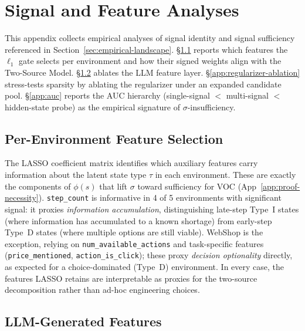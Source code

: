 \section{Signal and Feature Analyses}
\label{app:signal-analyses}

This appendix collects empirical analyses of signal identity
and signal sufficiency referenced in
Section~\ref{sec:empirical-landscape}.
\S\ref{app:feature-selection} reports which features the
$\ell_1$ gate selects per environment and how their signed weights
align with the Two-Source Model.
\S\ref{app:llm-features} ablates the LLM feature layer.
\S\ref{app:regularizer-ablation} stress-tests sparsity by
ablating the regularizer under an expanded candidate pool.
\S\ref{app:auc} reports the AUC hierarchy
(single-signal $<$ multi-signal $<$ hidden-state probe) as the
empirical signature of $\sigma$-insufficiency.

\subsection{Per-Environment Feature Selection}
\label{app:feature-selection}

The LASSO coefficient matrix identifies which auxiliary features
carry information about the latent state type $\tau$ in each
environment. These are exactly the components of $\phi(s)$ that
lift $\sigma$ toward sufficiency for VOC (App~\ref{app:proof-necessity}).
\texttt{step\_count} is informative in 4 of 5 environments with
significant signal: it proxies \emph{information accumulation},
distinguishing late-step Type~I states (where information has
accumulated to a known shortage) from early-step Type~D states
(where multiple options are still viable). WebShop is the
exception, relying on \texttt{num\_available\_actions} and
task-specific features (\texttt{price\_mentioned},
\texttt{action\_is\_click}); these proxy \emph{decision optionality}
directly, as expected for a choice-dominated (Type~D) environment.
In every case, the features LASSO retains are interpretable as
proxies for the two-source decomposition rather than ad-hoc
engineering choices.

\subsection{LLM-Generated Features}
\label{app:llm-features}

